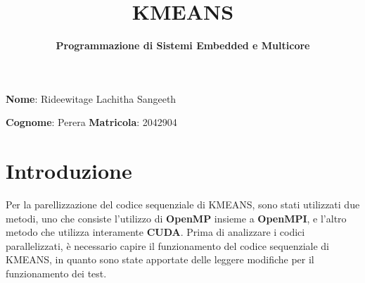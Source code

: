 \documentclass{article}
\title{\textbf{KMEANS}}
\author{\textbf{Programmazione di Sistemi Embedded e Multicore}}
\begin{document}
  \maketitle

  \begin{description}
    \centering
    \item \textbf{Nome}: Rideewitage Lachitha Sangeeth 
    \item \textbf{Cognome}: Perera \textbf{Matricola}: 2042904
  \end{description}

  \section{Introduzione}

  Per la parellizzazione del codice sequenziale di KMEANS, sono stati utilizzati due metodi, uno che consiste l'utilizzo di \textbf{OpenMP} insieme a \textbf{OpenMPI},
  e l'altro metodo che utilizza interamente \textbf{CUDA}.
  Prima di analizzare i codici parallelizzati, è necessario capire il funzionamento del codice sequenziale di KMEANS, in quanto sono state apportate delle leggere
  modifiche per il funzionamento dei test.
\end{document}
